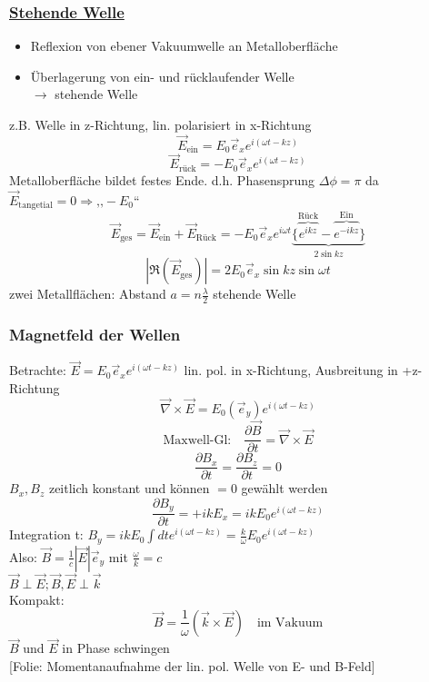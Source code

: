 \documentclass[titlepage,12pt,a4paper,ngerman]{report}
\newcommand{\tx}[1]{\textrm{#1}}
\newcommand{\folie}[1]{\color{gray}[Folie: #1]\color{black}}
\begin{document}
\subsubsection{\underline{Stehende Welle}}
\begin{itemize}
	\item Reflexion von ebener Vakuumwelle an Metalloberfläche
	\item Überlagerung von ein- und rücklaufender Welle\\
	$ \rightarrow $ stehende Welle
\end{itemize}
z.B. Welle in z-Richtung, lin. polarisiert in x-Richtung
$$\vec{E}_{\tx{ein}} = E_0 \vec{e}_x e^{i(\omega t - k z)}$$
$$\vec{E}_{\tx{rück}} = - E_0 \vec{e}_x e^{i(\omega t - k z)}$$
Metalloberfläche bildet festes Ende. d.h. Phasensprung $ \Delta \phi = \pi $ da $ \vec{E}_{\tx{tangetial}} = 0 \Rightarrow \tx{,,} - E_0 \tx{``} $
$$\vec{E}_{\tx{ges}} = \vec{E}_{\tx{ein}} + \vec{E}_{\tx{Rück}} = - E_0 \vec{e}_x e^{i \omega t} \underbrace{\{\overbrace{e^{ikz}}^{\tx{Rück}} - \overbrace{e^{-ikz}}^{\tx{Ein}}\}}_{2 \sin kz}$$
$$|\Re (\vec{E}_{\tx{ges}})| = 2 E_0 \vec{e}_x \sin kz \sin \omega t$$
zwei Metallflächen: Abstand $ a = n \frac{\lambda}{2} $ stehende Welle

\subsubsection{Magnetfeld der Wellen}
Betrachte: $ \vec{E} = E_0 \vec{e}_x e^{i(\omega t - k z)} $ lin. pol. in x-Richtung, Ausbreitung in +z-Richtung
$$\vec{\nabla} \times \vec{E} = E_0(\vec{e}_y) e^{i(\omega t - k z)}$$
$$\tx{Maxwell-Gl:} \quad \frac{\partial \vec{B}}{\partial t} = \vec{\nabla} \times \vec{E}$$
$$\frac{\partial B_x}{\partial t} =  \frac{\partial B_z}{\partial t} = 0$$
$ B_x, B_z $ zeitlich konstant und können $ = 0 $ gewählt werden
$$\frac{\partial B_y}{\partial t} = + ik E_x = ik E_0 e^{i(\omega t - k z)}$$
Integration t: $ B_y = ik E_0 \int dt e^{i(\omega t - k z)} = \frac{k}{\omega} E_0 e ^{i(\omega t - k z)}$\\
Also: $ \vec{B} = \frac{1}{c} |\vec{E}| \vec{e}_y $ mit $ \frac{\omega}{k} = c $\\
$ \vec{B} \perp \vec{E} ; \vec{B}, \vec{E} \perp \vec{k} $\\
Kompakt:
$$\boxed{\vec{B} = \frac{1}{\omega}(\vec{k} \times \vec{E}) } \quad \tx{im Vakuum}$$
$ \vec{B} $ und $ \vec{E} $ in Phase schwingen\\
\folie{Momentanaufnahme der lin. pol. Welle von E- und B-Feld}
\end{document}
